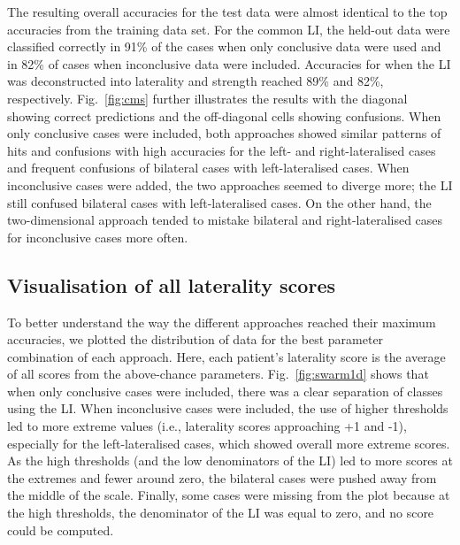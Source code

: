 \documentclass[fleqn,10pt]{SelfArx} %
\begin{document}
The resulting overall accuracies for the test data were almost identical to the top accuracies from the training data set. For the common LI, the held-out data were classified correctly in 91\% of the cases when only conclusive data were used and in 82\% of cases when inconclusive data were included. Accuracies for when the LI was deconstructed into laterality and strength reached 89\% and 82\%, respectively. Fig.~\ref{fig:cms} further illustrates the results with the diagonal showing correct predictions and the off-diagonal cells showing confusions. When only conclusive cases were included, both approaches showed similar patterns of hits and confusions with high accuracies for the left- and right-lateralised cases and frequent confusions of bilateral cases with left-lateralised cases. When inconclusive cases were added, the two approaches seemed to diverge more; the LI still confused bilateral cases with left-lateralised cases. On the other hand, the two-dimensional approach tended to mistake bilateral and right-lateralised cases for inconclusive cases more often.


\subsection{Visualisation of all laterality scores}
To better understand the way the different approaches reached their maximum accuracies, we plotted the distribution of data for the best parameter combination of each approach. Here, each patient’s laterality score is the average of all scores from the above-chance parameters. Fig.~\ref{fig:swarm1d} shows that when only conclusive cases were included, there was a clear separation of classes using the LI. When inconclusive cases were included, the use of higher thresholds led to more extreme values (i.e., laterality scores approaching +1 and -1), especially for the left-lateralised cases, which showed overall more extreme scores. As the high thresholds (and the low denominators of the LI) led to more scores at the extremes and fewer around zero, the bilateral cases were pushed away from the middle of the scale. Finally, some cases were missing from the plot because at the high thresholds, the denominator of the LI was equal to zero, and no score could be computed.
\end{document}
